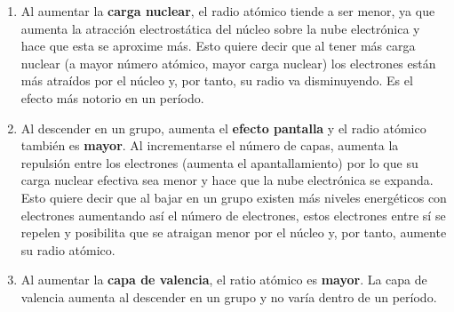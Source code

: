 \begin{enumerate}[label=\numberballmDarkTeal]
        \item Al aumentar la \textbf{carga nuclear}, el radio atómico tiende a ser menor, ya que aumenta la atracción electrostática del núcleo sobre la nube electrónica y hace que esta se aproxime más.
        Esto quiere decir que al tener más carga nuclear (a mayor número atómico, mayor carga nuclear) los electrones están más atraídos por el núcleo y, por tanto, su radio va disminuyendo.
        Es el efecto más notorio en un período.
        \item Al descender en un grupo, aumenta el \textbf{efecto pantalla} y el radio atómico también es \textbf{mayor}.
        Al incrementarse el número de capas, aumenta la repulsión entre los electrones (aumenta el apantallamiento) por lo que su carga nuclear efectiva sea menor y hace que la nube electrónica se expanda.
        Esto quiere decir que al bajar en un grupo existen más niveles energéticos con electrones aumentando así el número de electrones, estos electrones entre sí se repelen y posibilita que se atraigan menor por el núcleo y, por tanto, aumente su radio atómico.
        \item Al aumentar la \textbf{capa de valencia}, el ratio atómico es \textbf{mayor}.
        La capa de valencia aumenta al descender en un grupo y no varía dentro de un período.
\end{enumerate}
